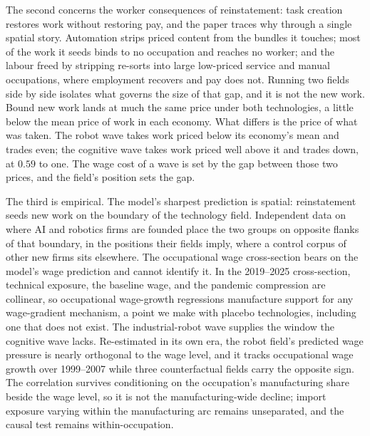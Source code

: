 \documentclass[12pt, a4paper]{article}
\begin{document}
The second concerns the worker consequences of reinstatement: task
creation restores work without restoring pay, and the paper traces why
through a single spatial story. Automation strips priced content from
the bundles it touches; most of the work it seeds binds to no occupation
and reaches no worker; and the labour freed by stripping re-sorts into
large low-priced service and manual occupations, where employment
recovers and pay does not. Running two fields side by side isolates what
governs the size of that gap, and it is not the new work. Bound new work
lands at much the same price under both technologies, a little below the
mean price of work in each economy. What differs is the price of what
was taken. The robot wave takes work priced below its economy's mean and
trades even; the cognitive wave takes work priced well above it and
trades down, at $0.59$ to one. The wage cost of a wave is set by the gap
between those two prices, and the field's position sets the gap.

The third is empirical.
The model's sharpest prediction is spatial: reinstatement seeds new work
on the boundary of the technology field. Independent data on where AI
and robotics firms are founded place the two groups on opposite flanks
of that boundary, in the positions their fields imply, where a control
corpus of other new firms sits elsewhere. The occupational wage
cross-section bears on the model's wage prediction and cannot identify
it. In the 2019--2025 cross-section, technical exposure, the baseline wage,
and the pandemic compression are collinear, so occupational wage-growth
regressions manufacture support for any wage-gradient mechanism, a point
we make with placebo technologies, including one that does not exist.
The industrial-robot wave supplies the window the cognitive wave lacks.
Re-estimated in its own era, the robot field's predicted wage pressure
is nearly orthogonal to the wage level, and it tracks occupational wage
growth over 1999--2007 while three counterfactual fields carry the
opposite sign. The correlation survives conditioning on the
occupation's manufacturing share beside the wage level, so it is not
the manufacturing-wide decline; import exposure varying within the
manufacturing arc remains unseparated, and the causal test remains
within-occupation.
\end{document}
